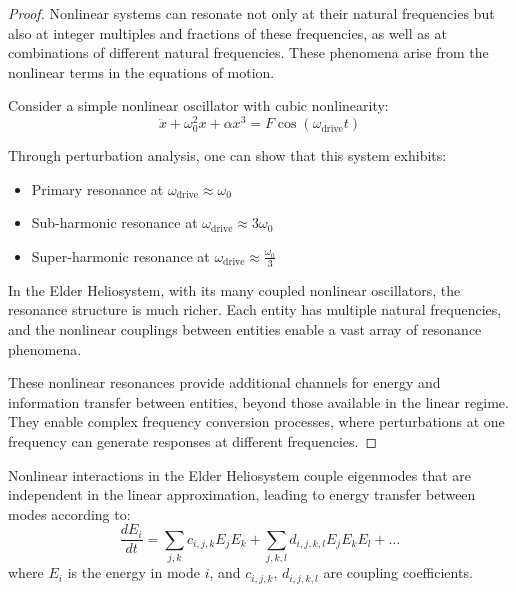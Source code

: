 \begin{proof}
Nonlinear systems can resonate not only at their natural frequencies but also at integer multiples and fractions of these frequencies, as well as at combinations of different natural frequencies. These phenomena arise from the nonlinear terms in the equations of motion.

Consider a simple nonlinear oscillator with cubic nonlinearity:
\begin{equation}
\ddot{x} + \omega_0^2 x + \alpha x^3 = F \cos(\omega_{\text{drive}} t)
\end{equation}

Through perturbation analysis, one can show that this system exhibits:
\begin{itemize}
    \item Primary resonance at $\omega_{\text{drive}} \approx \omega_0$
    \item Sub-harmonic resonance at $\omega_{\text{drive}} \approx 3\omega_0$
    \item Super-harmonic resonance at $\omega_{\text{drive}} \approx \frac{\omega_0}{3}$
\end{itemize}

In the Elder Heliosystem, with its many coupled nonlinear oscillators, the resonance structure is much richer. Each entity has multiple natural frequencies, and the nonlinear couplings between entities enable a vast array of resonance phenomena.

These nonlinear resonances provide additional channels for energy and information transfer between entities, beyond those available in the linear regime. They enable complex frequency conversion processes, where perturbations at one frequency can generate responses at different frequencies.
\end{proof}

\begin{theorem}
Nonlinear interactions in the Elder Heliosystem couple eigenmodes that are independent in the linear approximation, leading to energy transfer between modes according to:
\begin{equation}
\frac{dE_i}{dt} = \sum_{j,k} c_{i,j,k} E_j E_k + \sum_{j,k,l} d_{i,j,k,l} E_j E_k E_l + \ldots
\end{equation}
where $E_i$ is the energy in mode $i$, and $c_{i,j,k}$, $d_{i,j,k,l}$ are coupling coefficients.
\end{theorem}

